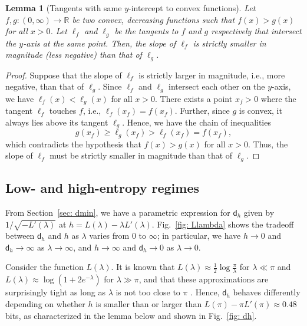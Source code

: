 \documentclass[11pt]{article}
\newcommand{\bbR}{\mathbb{R}}
\newcommand{\dist}{\mathsf{d}}
\newtheorem{lemma}{Lemma}
\begin{document}
	\begin{lemma}[Tangents with same $y$-intercept to convex functions] 
		\label{lem: tangent}
		Let $f,g : (0,\infty) \to \bbR$ be two convex, decreasing functions 
		such that $f(x) > g(x)$ for all $x > 0$. Let $\ell_f$ and $\ell_g$ be 
		the tangents to $f$ and $g$ respectively that intersect the $y$-axis at 
		the same point. Then, the slope of $\ell_f$ is strictly smaller in 
		magnitude (less negative) than that of $\ell_g$. 
	\end{lemma}
	\begin{proof}
		Suppose that the slope of $\ell_f$ is strictly larger in magnitude, 
		i.e., more negative, than that of $\ell_g$. Since $\ell_f$ and $\ell_g$ 
		intersect each other on the $y$-axis, we have $\ell_f(x) < \ell_g (x)$ 
		for all $x > 0$. There exists a point $x_f > 0$ where the tangent 
		$\ell_f$ touches $f$, i.e., $\ell_f(x_f) = f(x_f)$.
		Further, since $g$ is convex, it always lies above its tangent 
		$\ell_g$. Hence, we have the chain of inequalities 
		$$g(x_f) \geq \ell_g(x_f) > \ell_f(x_f) = f(x_f),$$
		which contradicts the hypothesis that $f(x) > g(x)$ for all $x > 0$. 
		Thus, the slope of $\ell_f$ must be strictly smaller in magnitude than 
		that of $\ell_g$. 
	\end{proof}
	
	
	
	
	\subsection{Low- and high-entropy regimes} \label{sec: ent_asymp}
	
	From Section~\ref{sec: dmin}, we have a parametric expression for $\dist_h$ given by $1/\sqrt{-L'(\lambda)}$ at $h = L(\lambda) - \lambda L'(\lambda)$. Fig.~\ref{fig: Llambda} shows the tradeoff between $\dist_h$ and $h$ as $\lambda$ varies from $0$ to $\infty$; in particular, we have $h \to 0$ and $\dist_h \to \infty$ as $\lambda \to \infty$, and $h \to \infty$ and $\dist_h \to 0$ as $\lambda \to 0$.
	
	Consider the function $L(\lambda)$. It is known that $L(\lambda) \approx \frac12\log\frac{\pi}{\lambda}$ for $\lambda \ll \pi$ and $L(\lambda) \approx \log(1 + 2 e^{-\lambda})$ for $\lambda \gg \pi$, and that these approximations are surprisingly tight as long as $\lambda$ is not too close to $\pi$ \cite{canonne2020discrete}. 
	Hence, $\dist_h$ behaves differently depending on whether $h$ is smaller than or larger than $L(\pi) - \pi L'(\pi) \approx 0.48$ bits, as characterized in the lemma below and shown in Fig.~\ref{fig: dh}.
	
\end{document}
